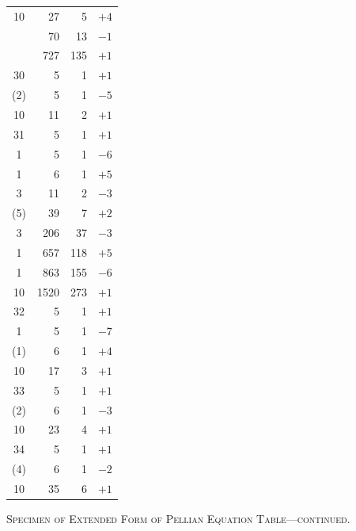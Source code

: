 \documentclass[11pt]{article}
\begin{document}
\begin{center}
\begin{tabular}{|c|r|r|r|}
10 & 27 & 5 & $+4$ \\
 & 70 & 13 & $-1$ \\
 & 727 & 135 & $+1$ \\
\hline
30 & 5 & 1 & $+1$ \\
(2) & 5 & 1 & $-5$ \\
10 & 11 & 2 & $+1$ \\
\hline
31 & 5 & 1 & $+1$ \\
1 & 5 & 1 & $-6$ \\
1 & 6 & 1 & $+5$ \\
3 & 11 & 2 & $-3$ \\
(5) & 39 & 7 & $+2$ \\
3 & 206 & 37 & $-3$ \\
1 & 657 & 118 & $+5$ \\
1 & 863 & 155 & $-6$ \\
10 & 1520 & 273 & $+1$ \\
\hline
32 & 5 & 1 & $+1$ \\
1 & 5 & 1 & $-7$ \\
(1) & 6 & 1 & $+4$ \\
10 & 17 & 3 & $+1$ \\
\hline
33 & 5 & 1 & $+1$ \\
(2) & 6 & 1 & $-3$ \\
10 & 23 & 4 & $+1$ \\
\hline
34 & 5 & 1 & $+1$ \\
(4) & 6 & 1 & $-2$ \\
10 & 35 & 6 & $+1$ \\
\hline
\end{tabular}
\end{center}

\begin{center}
\small\textsc{Specimen of Extended Form of Pellian Equation Table---continued.}
\end{center}
\end{document}
